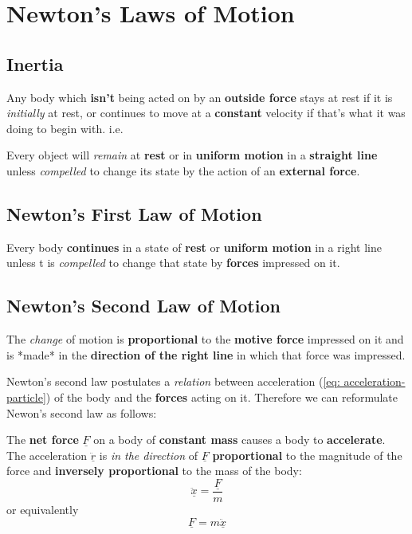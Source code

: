 \section{Newton's Laws of Motion}

\subsection{Inertia}
\begin{definition}
	Any body which {\bf isn’t} being acted on by an {\bf outside force} stays at rest if it is {\em initially} at rest, or continues to move at a {\bf constant} velocity if that’s what it was doing to begin with. i.e.

	Every object will \emph{remain} at {\bf rest} or in {\bf uniform motion} in a {\bf straight line} unless {\em compelled} to change its state by the action of an {\bf external force}.

\end{definition}

\subsection{Newton's First Law of Motion}
\begin{definition}
	Every body {\bf continues} in a state of {\bf rest} or {\bf uniform motion} in a right line unless t is {\em compelled} to change that state by {\bf forces} impressed on it.
\end{definition}

\subsection{Newton's Second Law of Motion}
\begin{definition}
	The {\em change} of motion is {\bf proportional} to the {\bf motive force} impressed on it and is *made* in the {\bf direction of the right line} in which that force was impressed.
\end{definition}

Newton's second law postulates a {\em relation} between acceleration (\ref{eq: acceleration-particle}) of the body and the {\bf forces} acting on it.  Therefore we can reformulate Newon's second law as follows:

\begin{definition}
	The {\bf net force} $\underline{F}$ on a body of {\bf constant mass} causes a body to {\bf accelerate}. The acceleration $\underline{\ddot{r}}$ is {\em in the direction} of $\underline{F}$ {\bf proportional} to the magnitude of the force and {\bf inversely proportional}  to the mass of the body:
	$$\ddot{\underline{x}} = \frac{\underline{F}}{m}$$
	or equivalently
	\begin{equation}
		\label{eq: newtons-second-law}
		\underline{F} = m\underline{\ddot{x}}
	\end{equation}

\end{definition}

